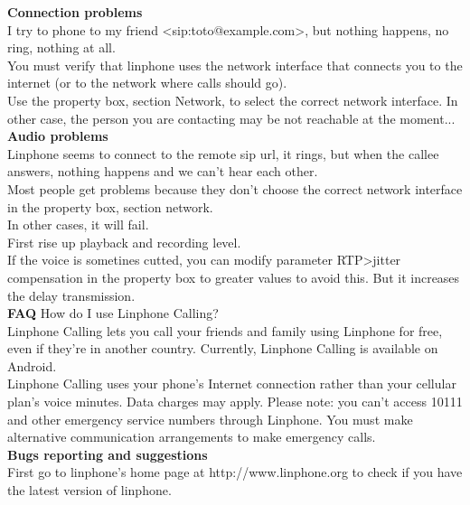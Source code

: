 \documentclass[a4paper]{article}
\begin{document}
\textbf{Connection problems} \\
I try to phone to my friend <sip:toto@example.com>, but nothing happens, no ring, nothing
at all. \\
You must verify that linphone uses the network interface that connects you to the
internet (or to the network where calls should go). \\
Use the property box, section Network, to select the correct network interface.
In other case, the person you are contacting may be not reachable at the moment... \\

\textbf{Audio problems} \\
Linphone seems to connect to the remote sip url, it rings, but when the callee answers,
nothing happens and we can't hear each other. \\

Most people get problems because they don't choose the correct network interface
in the property box, section network. \\

In other cases, it will fail. \\
First rise up playback and recording level. \\
If the voice is sometines cutted, you can modify parameter RTP\->jitter \\
compensation in the property box to greater values to avoid this. But it increases the
delay transmission. \\

\textbf{FAQ}
How do I use Linphone Calling? \\
Linphone Calling lets you call your friends and family using Linphone for free, even if they're in another country. Currently, Linphone Calling is available on Android. \\
Linphone Calling uses your phone's Internet connection rather than your cellular plan's voice minutes. Data charges may apply.
Please note: you can't access 10111 and other emergency service numbers through Linphone. You must make alternative communication arrangements to make emergency calls. \\

\textbf{Bugs reporting and suggestions} \\
First go to linphone's home page at http://www.linphone.org to check if you have the
latest version of linphone. \\
\end{document}
